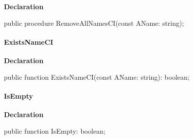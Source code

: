 \documentclass{report}
\newif\ifpdf
\begin{document}
\label{PasDoc_StringVector.TStringVector-RemoveAllNamesCI}
\begin{list}{}{
\setlength{\itemindent}{0cm}
\setlength{\listparindent}{0cm}
\setlength{\leftmargin}{\evensidemargin}
\addtolength{\leftmargin}{\tmplength}
\settowidth{\labelsep}{X}
\addtolength{\leftmargin}{\labelsep}
\setlength{\labelwidth}{\tmplength}
}
\item[\textbf{Declaration}\hfill]
\ifpdf
\begin{flushleft}
\fi
\begin{ttfamily}
public procedure RemoveAllNamesCI(const AName: string);\end{ttfamily}

\ifpdf
\end{flushleft}
\fi

\end{list}
\paragraph*{ExistsNameCI}\hspace*{\fill}

\label{PasDoc_StringVector.TStringVector-ExistsNameCI}
\begin{list}{}{
\setlength{\itemindent}{0cm}
\setlength{\listparindent}{0cm}
\setlength{\leftmargin}{\evensidemargin}
\addtolength{\leftmargin}{\tmplength}
\settowidth{\labelsep}{X}
\addtolength{\leftmargin}{\labelsep}
\setlength{\labelwidth}{\tmplength}
}
\item[\textbf{Declaration}\hfill]
\ifpdf
\begin{flushleft}
\fi
\begin{ttfamily}
public function ExistsNameCI(const AName: string): boolean;\end{ttfamily}

\ifpdf
\end{flushleft}
\fi

\end{list}
\paragraph*{IsEmpty}\hspace*{\fill}

\label{PasDoc_StringVector.TStringVector-IsEmpty}
\begin{list}{}{
\setlength{\itemindent}{0cm}
\setlength{\listparindent}{0cm}
\setlength{\leftmargin}{\evensidemargin}
\addtolength{\leftmargin}{\tmplength}
\settowidth{\labelsep}{X}
\addtolength{\leftmargin}{\labelsep}
\setlength{\labelwidth}{\tmplength}
}
\item[\textbf{Declaration}\hfill]
\ifpdf
\begin{flushleft}
\fi
\begin{ttfamily}
public function IsEmpty: boolean;\end{ttfamily}

\ifpdf
\end{flushleft}
\fi

\end{list}
\end{document}
